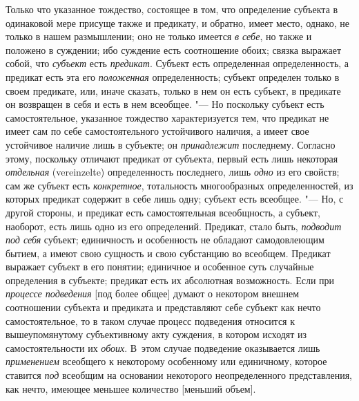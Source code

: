 {Только что указанное тождество, состоящее в том, что
определение субъекта в одинаковой мере присуще также и предикату, и
обратно, имеет место, однако, не только в нашем размышлении; оно не только
имеется {\em в себе}, но
также и положено в суждении; ибо суждение есть соотношение обоих; связка
выражает собой, что {\em субъект}
есть {\em предикат}.
Субъект есть определенная определенность, а предикат есть эта
его {\em положенная}
определенность; субъект определен только в своем предикате,
или, иначе сказать, только в нем он есть субъект, в предикате он возвращен
в себя и есть в нем всеобщее. "--- Но поскольку субъект есть
самостоятельное, указанное тождество характеризуется тем, что предикат не
имеет сам по себе самостоятельного устойчивого наличия, а имеет свое
устойчивое наличие лишь в субъекте; он
{\em принадлежит}
последнему. Согласно этому, поскольку отличают предикат от
субъекта, первый есть лишь некоторая
{\em отдельная} (vereinzelte)
определенность последнего, лишь
{\em одно} из его
свойств; сам же субъект есть
{\em конкретное},
тотальность многообразных определенностей, из которых
предикат содержит в себе лишь одну; субъект есть всеобщее. "---
Но, с другой стороны, и предикат есть самостоятельная
всеобщность, а субъект, наоборот, есть лишь одно из его определений.
Предикат, стало быть, {\em подводит под
себя} субъект; единичность и особенность не обладают
самодовлеющим бытием, а имеют свою сущность и свою субстанцию во всеобщем.
Предикат выражает субъект в его понятии; единичное и особенное суть
случайные определения в субъекте; предикат есть их абсолютная возможность.
Если при {\em процессе подведения}
[под более общее] думают о некотором внешнем соотношении
субъекта и предиката и представляют себе субъект как нечто самостоятельное,
то в таком случае процесс подведения относится к вышеупомянутому
субъективному акту суждения, в котором исходят из самостоятельности их
{\em обоих}. В~этом
случае подведение оказывается лишь
{\em применением}
всеобщего к некоторому особенному или единичному, которое
ставится {\em под}
всеобщим на основании некоторого
неопределенного представления, как нечто, имеющее меньшее
количество [меньший объем].

}
